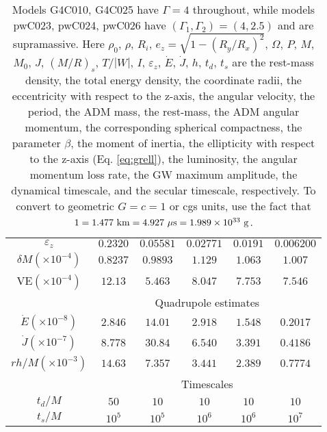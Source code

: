 \documentclass[twocolumn,superscriptaddress,showpacs,prd,aps,amsmath,amssymb,nofootinbib]{revtex4-1}
\newcommand{\GB}{\beta}
\newcommand{\GD}{\delta}
\newcommand{\GR}{\rho}
\newcommand{\tdoMmin}{(t_d/M)_{\rm min}}
\newcommand{\tsoMmin}{(t_s/M)_{\rm min}}
\begin{document}
\begin{table}
\begin{tabular}{c|ccccc}
$\varepsilon_z$          & $0.2320$   & $0.05581$  & $0.02771$  & $0.0191$   & $0.006200$ \\  
$\GD M(\times 10^{-4})$  & $0.8237$   & $0.9893$   & $1.129$    & $1.063$    & $1.007$     \\  
VE$(\times 10^{-4})$     & $12.13$    & $5.463$    & $8.047$    & $7.753$    & $7.546$     \\  
\hline
\hline
   & \multicolumn{5}{c}{Quadrupole estimates}  \\
\hline
$\dot{E}(\times 10^{-8})$ & $2.846$  & $14.01$     & $2.918$    & $1.548$     & $0.2017$     \\  
$\dot{J}(\times 10^{-7})$ & $8.778$  & $30.84$     & $6.540$    & $3.391$     & $0.4186$     \\  
$rh/M(\times 10^{-3})$   & $14.63$   & $7.357$     & $3.441$    & $2.389$     & $0.7774$     \\  
\hline
\hline
   & \multicolumn{5}{c}{Timescales}  \\
\hline
$t_d/M$                  & $50$       & $10$       & $10$       & $10$       & $10$       \\  
$t_s/M$                 & $10^5$     & $10^5$      & $10^6$      & $10^6$      & $10^7$      \\  
\hline
\hline
\end{tabular}
\caption{Models G4C010, G4C025 have $\Gamma=4$ throughout, while
models pwC023, pwC024, pwC026 have $(\Gamma_1,\Gamma_2)=(4,2.5)$ and
are supramassive. Here $\GR_0$, $\GR$, $R_i$, $e_z=\sqrt{1-(R_y/R_x)^2}$,
$\Omega$, $P$, $M$, $M_0$, $J$, $(M/R)_s$, $T/|W|$, $I$,
$\varepsilon_z$, $\dot{E}$, $\dot{J}$, $h$, $t_d$, $t_s$ are the
rest-mass density, the total energy density, the coordinate radii, the
eccentricity with respect to the z-axis, the angular velocity, the
period, the ADM mass, the rest-mass, the ADM angular momentum, the
corresponding spherical compactness, the parameter $\GB$, the moment
of inertia, the ellipticity with respect to the z-axis
(Eq. \ref{eq:grell}), the luminosity, the angular momentum loss rate,
the GW maximum amplitude, the dynamical timescale, and the secular
timescale, respectively. 
To convert to geometric $G=c=1$ or cgs units, use the fact that 
$1=1.477\ {\rm km}=4.927\ {\rm \mu s} = 1.989\times 10^{33}\ {\rm g}$.}
\label{tab:id_param}
\end{table}
\end{document}
